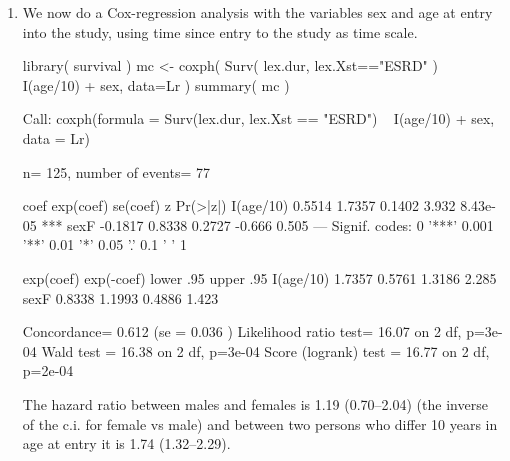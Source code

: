 \begin{enumerate}


\item We now do a Cox-regression analysis with the variables sex and age at
  entry into the study, using time since entry to the study as time scale.
\begin{Schunk}
\begin{Sinput}
 library( survival )
 mc <- coxph( Surv( lex.dur, lex.Xst=="ESRD" ) ~
              I(age/10) + sex, data=Lr )
 summary( mc )
\end{Sinput}
\begin{Soutput}
Call:
coxph(formula = Surv(lex.dur, lex.Xst == "ESRD") ~ I(age/10) + 
    sex, data = Lr)

  n= 125, number of events= 77 

             coef exp(coef) se(coef)      z Pr(>|z|)    
I(age/10)  0.5514    1.7357   0.1402  3.932 8.43e-05 ***
sexF      -0.1817    0.8338   0.2727 -0.666    0.505    
---
Signif. codes:  0 '***' 0.001 '**' 0.01 '*' 0.05 '.' 0.1 ' ' 1

          exp(coef) exp(-coef) lower .95 upper .95
I(age/10)    1.7357     0.5761    1.3186     2.285
sexF         0.8338     1.1993    0.4886     1.423

Concordance= 0.612  (se = 0.036 )
Likelihood ratio test= 16.07  on 2 df,   p=3e-04
Wald test            = 16.38  on 2 df,   p=3e-04
Score (logrank) test = 16.77  on 2 df,   p=2e-04
\end{Soutput}
\end{Schunk}
The hazard ratio between males and females is 1.19 (0.70--2.04) (the
inverse of the c.i. for female vs male) and between two persons who
differ 10 years in age at entry it is 1.74 (1.32--2.29).


\end{enumerate}
